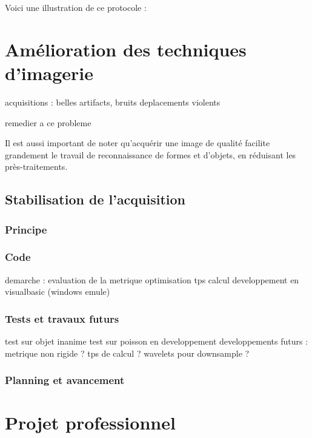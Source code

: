 Voici une illustration de ce protocole :


\section{Amélioration des techniques d'imagerie}


acquisitions :
belles
artifacts, bruits
deplacements violents

remedier a ce probleme


Il est aussi important de noter qu'acquérir une image de qualité facilite grandement le travail de reconnaissance de formes et d'objets, en réduisant les près-traitements.

\subsection{Stabilisation de l'acquisition}

\subsubsection{Principe}


\subsubsection{Code}

demarche : evaluation de la metrique
optimisation tps calcul
developpement en visualbasic (windows emule)

\subsubsection{Tests et travaux futurs}
test sur objet inanime
test sur poisson en developpement
developpements futurs :
metrique non rigide ?
tps de calcul ?
wavelets pour downsample ?


\subsubsection{Planning et avancement}













\section{Projet professionnel}

